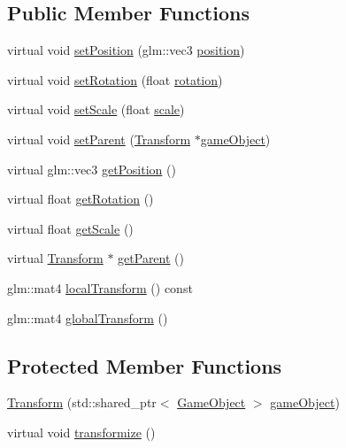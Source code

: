 \subsection*{Public Member Functions}
\begin{DoxyCompactItemize}
\item 
virtual void \hyperlink{class_mason_1_1_transform_a740f389e20c0190c52bcb893aeaa0490}{set\+Position} (glm\+::vec3 \hyperlink{class_mason_1_1_transform_ac9e11b4ec4433a38ac1100f12c955dcb}{position})
\item 
virtual void \hyperlink{class_mason_1_1_transform_aef821c00885810e430f61b274a6089db}{set\+Rotation} (float \hyperlink{class_mason_1_1_transform_a1ff204c28b286c45743fbbd03d8193a6}{rotation})
\item 
virtual void \hyperlink{class_mason_1_1_transform_a498d685b66e2f73b88d3583ce55461c8}{set\+Scale} (float \hyperlink{class_mason_1_1_transform_a0a12711710700aca2523630c1014dc17}{scale})
\item 
virtual void \hyperlink{class_mason_1_1_transform_a6e1a6b57214a7de21595e6af8b05138b}{set\+Parent} (\hyperlink{class_mason_1_1_transform}{Transform} $\ast$\hyperlink{class_mason_1_1_component_abaa67b569d0a70e26a4606f4a099a925}{game\+Object})
\item 
virtual glm\+::vec3 \hyperlink{class_mason_1_1_transform_a0b21f641e72d7b55f3a630b986d0b106}{get\+Position} ()
\item 
virtual float \hyperlink{class_mason_1_1_transform_ab15164f1690929c45e636514c0dafb7f}{get\+Rotation} ()
\item 
virtual float \hyperlink{class_mason_1_1_transform_afb5f0dbe6bcd49e26a792f578bf5ec9d}{get\+Scale} ()
\item 
virtual \hyperlink{class_mason_1_1_transform}{Transform} $\ast$ \hyperlink{class_mason_1_1_transform_ae3e8acbd25d7d171aff00da038f79a9a}{get\+Parent} ()
\item 
glm\+::mat4 \hyperlink{class_mason_1_1_transform_a70d142174711ef237e176e4972a194e2}{local\+Transform} () const
\item 
glm\+::mat4 \hyperlink{class_mason_1_1_transform_a35e627aa09604bf3a81f4c07d28205f3}{global\+Transform} ()
\end{DoxyCompactItemize}
\subsection*{Protected Member Functions}
\begin{DoxyCompactItemize}
\item 
\hyperlink{class_mason_1_1_transform_a61406a0dbfdd518be1d038fc8ed18a7a}{Transform} (std\+::shared\+\_\+ptr$<$ \hyperlink{class_mason_1_1_game_object}{Game\+Object} $>$ \hyperlink{class_mason_1_1_component_abaa67b569d0a70e26a4606f4a099a925}{game\+Object})
\item 
virtual void \hyperlink{class_mason_1_1_transform_a4dd61568d49044377f3312397ffdafd1}{transformize} ()
\end{DoxyCompactItemize}
